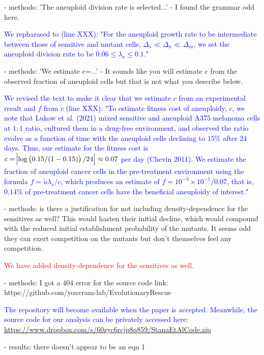 \documentclass[12pt]{extarticle}
\begin{document}
- methods: 'The aneuploid division rate is selected...' - I found the grammar odd here.

\textcolor{blue}{%
We repharased to (line XXX): "For the aneuploid growth rate to be intermediate between those of sensitive and mutant cells, $\Delta_s\ll\Delta_a\ll\Delta_m$, we set the aneuploid division rate to be $0.06 \le \lambda_a \le 0.1$."
} 

- methods: 'We estimate c=...' - It sounds like you will estimate c from the observed fraction of aneuploid cells but that is not what you describe below.

\textcolor{blue}{%
We revised the text to make it clear that we estimate $c$ from an experimental result and $f$ from $c$ (line XXX): "To estimate fitness cost of aneuploidy, $c$, we note that Lukow et al. (2021) mixed sensitive and aneuploid A375 melanoma cells at $1:1$ ratio, cultured them in a drug-free environment, and observed the ratio evolve as a function of time with the aneuploid cells declining to $15\%$ after 24 days. Thus, our estimate for the fitness cost is $c=\abs{\log\left(0.15/(1-0.15)\right)/24}\approx0.07$ per day (Chevin 2011).
We estimate the fraction of aneuploid cancer cells in the pre-treatment environment using the formula $f=\tilde{u}\lambda_s / c$, which produces an estimate of $f=10^{-3}\times10^{-1}/0.07$, that is, $0.14\%$ of pre-treatment cancer cells have the beneficial aneuploidy of interest."
} 

- methods: is there a justification for not including density-dependence for the sensitives as well? This would hasten their initial decline, which would compound with the reduced initial establishment probability of the mutants. It seems odd they can exert competition on the mutants but don't themselves feel any competition.

\textcolor{red}{We have added density-dependence for the sensitives as well.}%

- methods: I got a 404 error for the source code link: https://github.com/yoavram-lab/EvolutionaryRescue

\textcolor{blue}{
The repository will become available when the paper is accepted. Meanwhile, the source code for our analysis can be privately accessed here: \url{https://www.dropbox.com/s/60zyc6rcjp8q859/StanaEtAlCode.zip}
}

- results: there doesn't appear to be an eqn 1
\end{document}
